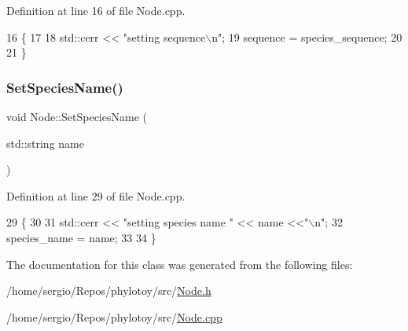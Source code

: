 Definition at line 16 of file Node.\+cpp.


\begin{DoxyCode}
16                                                 \{
17   
18   std::cerr << \textcolor{stringliteral}{"setting sequence\(\backslash\)n"};
19   sequence = species\_sequence;
20   
21 \}
\end{DoxyCode}
\mbox{\label{classNode_af4ba012237c10c42f2118e629633b844}} 
\subsubsection{\texorpdfstring{Set\+Species\+Name()}{SetSpeciesName()}}
{\footnotesize\ttfamily void Node\+::\+Set\+Species\+Name (\begin{DoxyParamCaption}\item[{std\+::string}]{name }\end{DoxyParamCaption})}



Definition at line 29 of file Node.\+cpp.


\begin{DoxyCode}
29                                        \{
30   
31   std::cerr << \textcolor{stringliteral}{"setting species name "} << name <<\textcolor{stringliteral}{"\(\backslash\)n"};
32   species\_name = name;
33   
34 \}
\end{DoxyCode}


The documentation for this class was generated from the following files\+:\begin{DoxyCompactItemize}
\item 
/home/sergio/\+Repos/phylotoy/src/\hyperlink{Node_8h}{Node.\+h}\item 
/home/sergio/\+Repos/phylotoy/src/\hyperlink{Node_8cpp}{Node.\+cpp}\end{DoxyCompactItemize}
